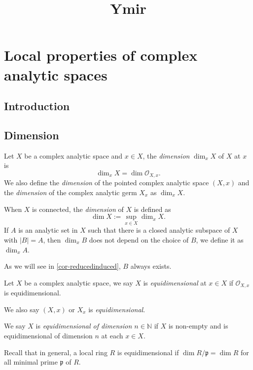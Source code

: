 
\title{Ymir}

\maketitle
\tableofcontents

\chapter*{Local properties of complex analytic spaces}\label{chap-propcomplex}

\section{Introduction}\label{sec-introduction-propertycomplex}


\section{Dimension}

\begin{definition}
    Let $X$ be a complex analytic space and $x\in X$, the \emph{dimension} $\dim_x X$ of $X$ at $x$ is 
    \[
        \dim_x X=\dim \mathcal{O}_{X,x}.
    \]
    We also define the \emph{dimension} of the pointed complex analytic space $(X,x)$ and the \emph{dimension} of the complex analytic germ $X_x$ as $\dim_x X$.

    When $X$ is connected, the \emph{dimension} of $X$ is defined as
    \[
        \dim X:=\sup_{x\in X}\dim_x X.  
    \]
    If $A$ is an analytic set in $X$ such that there is a closed analytic subspace of $X$ with $|B|=A$, then $\dim_x B$ does not depend on the choice of $B$, we define it as $\dim_x A$. 
\end{definition}
As we will see in \cref{cor-reducedinduced}, $B$ always exists.


\begin{definition}
    Let $X$ be a complex analytic space, we say $X$ is \emph{equidimensional} at $x\in X$ if $\mathcal{O}_{X,x}$ is equidimensional.

    We also say $(X,x)$ or $X_x$ is \emph{equidimensional}.

    We say $X$ is \emph{equidimensional of dimension $n\in \mathbb{N}$} if $X$ is non-empty and is equidimensional of dimension $n$ at each $x\in X$.
\end{definition}
Recall that in general, a local ring $R$ is equidimensional if $\dim R/\mathfrak{p}=\dim R$ for all minimal prime $\mathfrak{p}$ of $R$.

